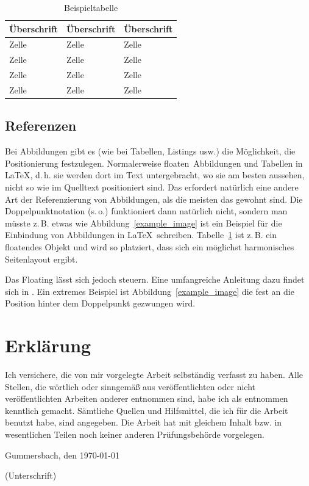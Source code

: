 \documentclass[12pt,oneside,a4paper,bibtotoc,liststotoc]{scrreprt}
\newcommand{\zB}{\mbox{z.\,B.}\xspace}
\newcommand{\dH}{\mbox{d.\,h.}\xspace}
\newcommand{\so}{\mbox{s.\,o.}\xspace}
\begin{document}
\begin{table}
  \centering
  \begin{tabular}{l|ll}
    \toprule
    Überschrift & Überschrift & Überschrift \\
    \midrule
    Zelle & Zelle & Zelle \\
    Zelle & Zelle & Zelle \\
    Zelle & Zelle & Zelle \\
    Zelle & Zelle & Zelle \\
    \bottomrule
  \end{tabular}
  \caption{Beispieltabelle}
  \label{example_table}
\end{table}

\section{Referenzen}

Bei Abbildungen gibt es (wie bei Tabellen, Listings usw.) die
Möglichkeit, die Positionierung festzulegen. Normalerweise \glqq
floaten\grqq\ Abbildungen und Tabellen in \LaTeX, \dH sie werden dort
im Text untergebracht, wo sie am besten aussehen, nicht so wie im
Quelltext positioniert sind. Das erfordert natürlich eine andere Art
der Referenzierung von Abbildungen, als die meisten das gewohnt
sind. Die Doppelpunktnotation (\so) funktioniert dann natürlich nicht,
sondern man müsste \zB etwas wie \glqq Abbildung~\ref{example_image}
ist ein Beispiel für die Einbindung von Abbildungen in \LaTeX \grqq\
schreiben. Tabelle~\ref{example_table} ist \zB ein floatendes Objekt
und wird so platziert, dass sich ein möglichst harmonisches
Seitenlayout ergibt.

Das Floating lässt sich jedoch steuern. Eine umfangreiche Anleitung
dazu findet sich in \cite[][]{WikibookFloats}. Ein extremes Beispiel
ist Abbildung~\ref{example_image} die fest an die Position hinter dem
Doppelpunkt gezwungen wird.

{}


\appendix

\chapter{Erklärung}

Ich versichere, die von mir vorgelegte Arbeit selbständig verfasst zu
haben. Alle Stellen, die wörtlich oder sinngemäß aus veröffentlichten
oder nicht veröffentlichten Arbeiten anderer entnommen sind, habe ich
als entnommen kenntlich gemacht. Sämtliche Quellen und Hilfsmittel,
die ich für die Arbeit benutzt habe, sind angegeben. Die Arbeit hat
mit gleichem Inhalt bzw. in wesentlichen Teilen noch keiner anderen
Prüfungsbehörde vorgelegen.

\bigskip

Gummersbach, den \today

\bigskip

\bigskip

\bigskip

\bigskip

\bigskip

\bigskip

(Unterschrift)
\end{document}
